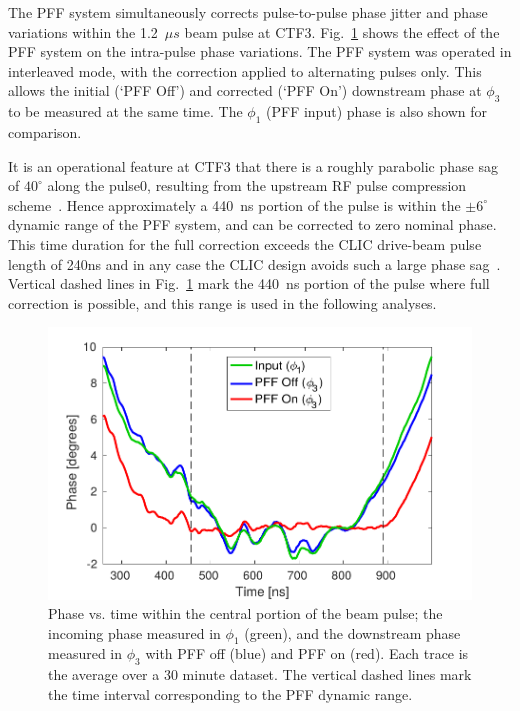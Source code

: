 \documentclass[%
 reprint,
 superscriptaddress,
 amsmath,
 amssymb,
 prl,
]{revtex4-1}
\begin{document}
The PFF system simultaneously corrects pulse-to-pulse phase jitter and phase 
variations within the 1.2~\(\mu s\) beam pulse at CTF3. 
Fig.~\ref{fig:shape} shows the effect of the PFF system on the intra-pulse 
phase variations. The PFF system was operated in interleaved mode, with 
the correction applied to alternating pulses only. This allows 
the initial (`PFF Off') and corrected (`PFF On') downstream phase at \(\phi_3\)
to be measured at the same time. The \(\phi_1\) (PFF input) phase 
is also shown for comparison. 

It is an operational feature at CTF3 that there is a roughly parabolic phase 
sag of \(40^\circ\) along the pulse0, resulting from the upstream RF pulse 
compression 
scheme~\cite{CLICCDR}. Hence approximately a 440~ns portion of the pulse is 
within the \(\pm 6^\circ\) dynamic range of the PFF system, and can be 
corrected to zero nominal phase. 
This time duration for the full correction exceeds the CLIC drive-beam pulse 
length of 240ns and in any case the CLIC design avoids such 
a large phase sag~\cite{CLICCDR}. 
Vertical dashed lines in Fig.~\ref{fig:shape} mark the 440~ns portion of 
the pulse where full correction is possible, and this range is used in the 
following analyses. 

\begin{figure}
	\includegraphics[width=\columnwidth]{figs/shape}
	\caption{\label{fig:shape}Phase vs. time within the central portion of the  
	beam pulse; the incoming phase measured in \(\phi_1\) 
	(green), and the downstream phase measured in \(\phi_3\) with PFF off 
	(blue) and PFF on (red). Each trace is the average over a 30 minute dataset.
	The vertical dashed lines mark the time interval corresponding to the PFF 
	dynamic range. }
\end{figure}
\end{document}
